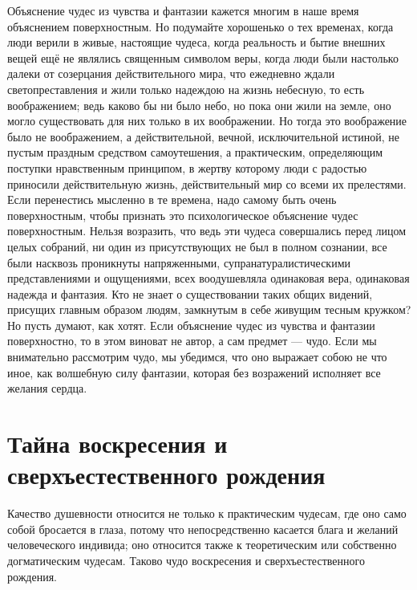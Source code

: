 \documentclass[12pt,oneside]{book}
\begin{document}
Объяснение чудес из чувства и фантазии кажется многим в наше время объяснением поверхностным. Но подумайте хорошенько о тех временах, когда люди верили в живые, настоящие чудеса, когда реальность и бытие внешних вещей ещё не являлись священным символом веры, когда люди были настолько далеки от созерцания действительного мира, что ежедневно ждали светопреставления и жили только надеждою на жизнь небесную, то есть воображением; ведь каково бы ни было небо, но пока они жили на земле, оно могло существовать для них только в их воображении. Но тогда это воображение было не воображением, а действительной, вечной, исключительной истиной, не пустым праздным средством самоутешения, а практическим, определяющим поступки нравственным принципом, в жертву которому люди с радостью приносили действительную жизнь, действительный мир со всеми их прелестями. Если перенестись мысленно в те времена, надо самому быть очень поверхностным, чтобы признать это психологическое объяснение чудес поверхностным. Нельзя возразить, что ведь эти чудеса совершались перед лицом целых собраний, ни один из присутствующих не был в полном сознании, все были насквозь проникнуты напряженными, супранатуралистическими представлениями и ощущениями, всех воодушевляла одинаковая вера, одинаковая надежда и фантазия. Кто не знает о существовании таких общих видений, присущих главным образом людям, замкнутым в себе живущим тесным кружком? Но пусть думают, как хотят. Если объяснение чудес из чувства и фантазии поверхностно, то в этом виноват не автор, а сам предмет --- чудо. Если мы внимательно рассмотрим чудо, мы убедимся, что оно выражает собою не что иное, как волшебную силу фантазии, которая без возражений исполняет все желания сердца\ddag\let\svthefootnote\thefootnote\let\thefootnote\relax{}\let\thefootnote\svthefootnote.







\chapter{Тайна воскресения и сверхъестественного рождения}


Качество душевности относится не только к практическим чудесам, где оно само собой бросается в глаза, потому что непосредственно касается блага и желаний человеческого индивида; оно относится также к теоретическим или собственно догматическим чудесам. Таково чудо воскресения и сверхъестественного рождения.
\end{document}
